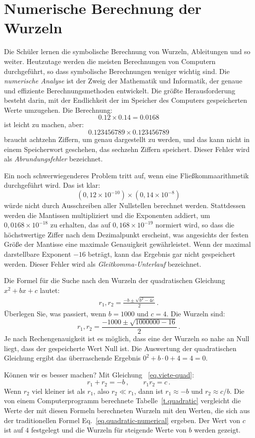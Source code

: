 \section{Numerische Berechnung der Wurzeln}\label{s.numerical}


Die Schüler lernen die symbolische Berechnung von Wurzeln, Ableitungen und so weiter. Heutzutage werden die meisten Berechnungen von Computern durchgeführt, so dass symbolische Berechnungen weniger wichtig sind. Die \emph{numerische Analyse} ist der Zweig der Mathematik und Informatik, der genaue und effiziente Berechnungsmethoden entwickelt. Die größte Herausforderung besteht darin, mit der Endlichkeit der im Speicher des Computers gespeicherten Werte umzugehen. Die Berechnung:
\[0.12\times 0.14=0.0168\]
ist leicht zu machen, aber:
\[
0.123456789\times 0.123456789
\]
braucht achtzehn Ziffern, um genau dargestellt zu werden, und das kann nicht in einem Speicherwort geschehen, das sechzehn Ziffern speichert. Dieser Fehler wird als \emph{Abrundungsfehler} bezeichnet.

Ein noch schwerwiegenderes Problem tritt auf, wenn eine Fließkommaarithmetik durchgeführt wird. Das ist klar:
\[(0,12\times 10^{-10})\times (0,14\times 10^{-8})\]
würde nicht durch Ausschreiben aller Nullstellen berechnet werden. Stattdessen werden die Mantissen multipliziert und die Exponenten addiert, um $0,0168\times 10^{-18}$ zu erhalten, das auf $0,168\times 10^{-19}$ normiert wird, so dass die höchstwertige Ziffer nach dem Dezimalpunkt erscheint, was angesichts der festen Größe der Mantisse eine maximale Genauigkeit gewährleistet. Wenn der maximal darstellbare Exponent $-16$ beträgt, kann das Ergebnis gar nicht gespeichert werden. Dieser Fehler wird als \emph{Gleitkomma-Unterlauf} bezeichnet.

Die Formel für die Suche nach den Wurzeln der quadratischen Gleichung $x^2+bx+c$ lautet:
\begin{align}
r_1, r_2 = \frac{-b\pm\sqrt{b^2-4c}}{2}\,.\label{eq.quadratic-numerical}
\end{align}
Überlegen Sie, was passiert, wenn $b=1000$ und $c=4$. Die Wurzeln sind:
\[
r_1, r_2 = \frac{-1000\pm\sqrt{1000000-16}}{2}\,.
\]
Je nach Rechengenauigkeit ist es möglich, dass eine der Wurzeln so nahe an Null liegt, dass der gespeicherte Wert Null ist. Die Auswertung der quadratischen Gleichung ergibt das überraschende Ergebnis $0^2+b\cdot 0 +4= 4= 0$.

Können wir es besser machen? Mit Gleichung ~\ref{eq.viete-quad}:
\[
r_1+r_2 = -b\,,\quad\quad r_1r_2=c\,.
\]
Wenn $r_2$ viel kleiner ist als $r_1$, also $r_2\ll r_1$, dann ist $r_1\approx -b$ und $r_2\approx c/b$. Die von einem Computerprogramm berechnete Tabelle~\ref{t.quadratic} vergleicht die Werte der mit diesen Formeln berechneten Wurzeln mit den Werten, die sich aus der traditionellen Formel Eq.~\ref{eq.quadratic-numerical} ergeben. Der Wert von $c$ ist auf $4$ festgelegt und die Wurzeln für steigende Werte von $b$ werden gezeigt.


